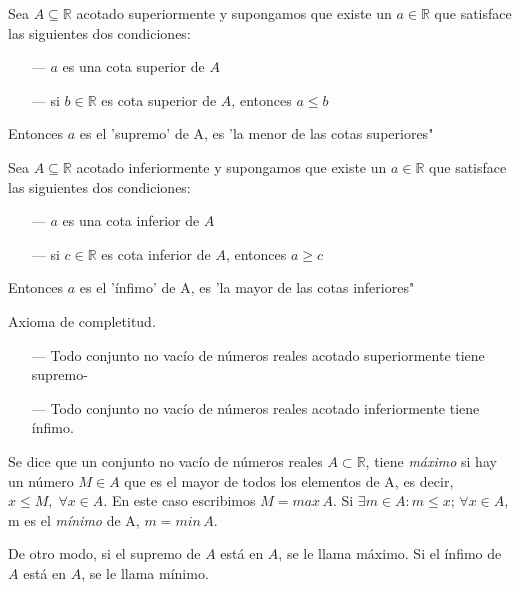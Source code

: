 		\begin{defi}
		Sea $A \subseteq  \mathbb R$ acotado superiormente y supongamos que existe un $a\in \mathbb R$ que satisface las siguientes dos condiciones:
		
			\begin{itemize}
				\item [---] $a$ es una cota superior de $A$
				\item [---] si $b\in \mathbb R$ es cota superior de $A$, entonces $a\le b$
			\end{itemize}
			
		Entonces $a$ es el 'supremo' de A, es 'la menor de las cotas superiores"
		\end{defi}

		\begin{defi}
		Sea $A \subseteq \mathbb R$ acotado inferiormente y supongamos que existe un $a\in \mathbb R$ que satisface las siguientes dos condiciones:
		
			\begin{itemize}
				\item [---] $a$ es una cota inferior de $A$
				\item [---] si $c\in \mathbb R$ es cota inferior de $A$, entonces $a\ge c$
			\end{itemize}
			
		Entonces $a$ es el 'ínfimo' de A, es 'la mayor de las cotas inferiores"
		\end{defi}
		
		\begin{axio}Axioma de completitud.
		
			\begin{itemize}
				\item [---] Todo conjunto no vacío de números reales acotado superiormente tiene supremo-
				\item [---] Todo conjunto no vacío de números reales acotado inferiormente tiene ínfimo.
			\end{itemize}
			
		\end{axio}

	
		\begin{defi} Se dice que un conjunto no vacío de números reales $A \subset \mathbb R$, tiene \emph{máximo} si hay un número $M\in A$ que es el mayor de todos los elementos de A, es decir, $x\le M,\; \forall x \in A$. En este caso escribimos $M=max\, A$. Si $\exists m \in A : m\le x;\, \forall x \in A$, m es el \emph{mínimo} de A, $m=min\, A$.
		
			De otro modo, si el supremo de $A$ está en $A$, se le llama máximo. Si el ínfimo de $A$ está en $A$, se le llama mínimo.
		\end{defi}
		
